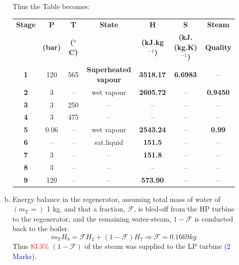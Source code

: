 \documentclass[12pt,twoside]{report}
\begin{document}
\begin{description}
\begin{enumerate}[(a)]
Thus the Table becomes:
\begin{center}
\begin{tabular} {||c | c c c c c c || }
\hline\hline
{\bf Stage} & {\bf P}    & {\bf T}        & {\bf State}    & {\bf H}             & {\bf S}                  & {\bf Steam}\\
            & {\bf (bar)}& {\bf ($^{o}$C)} &               & {\bf (kJ.kg$^{-1}$)} & {\bf (kJ.(kg.K)$^{-1}$)}  & {\bf Quality}\\
\hline\hline
 {\bf 1 }   & 120        & 565            &{\bf Superheated vapour}&{\bf 3518.17}&{\bf 6.6983}              & --          \\
 {\bf 2 }   & 3          &  --            &   wet vapour   &{\bf 2605.72}        &   --                     & {\bf 0.9450}   \\
 {\bf 3 }   & 3          & 250            &   --           & --                  & --                       & --           \\
 {\bf 4 }   & 3          & 475            &   --           & --                  & --                       & --            \\
 {\bf 5 }   & 0.06       & --             &   wet vapour   & {\bf 2543.24}       & --                       & {\bf 0.99}     \\
 {\bf 6 }   & --         & --             &   sat.liquid   & {\bf 151.5}         & --                       & -- \\
 {\bf 7 }   & 3          & --             &   --           & {\bf 151.8}         & --                       & --     \\
 {\bf 8 }   & 3          & --             &   --           & --                  & --                       & --           \\
 {\bf 9 }   & 120        & --             &   --           & {\bf 573.90}        &  --                      & -- \\
\hline\hline
\end{tabular}
\end{center}


\item Energy balance in the regenerator, assuming total mass of water of $\left(m_{\text{T}}=\right)$ 1 kg, and that a fraction, $\mathcal{F}$, is bled-off from the HP turbine to the regenerator, and the remaining water-steam, $1-\mathcal{F}$ is conducted back to the boiler.
\begin{displaymath}
m_{\text{T}}H_{8} = \mathcal{F} H_{2} + \left(1-\mathcal{F}\right)H_{7} \Rightarrow \mathcal{F} = 0.1669 kg
\end{displaymath}
Thus \textcolor{red}{83.3$\%$} $\left(1-\mathcal{F}\right)$ of the steam was supplied to the LP turbine \textcolor{blue}{(2 Marks)}.


\end{enumerate}
\end{description}
\end{document}
